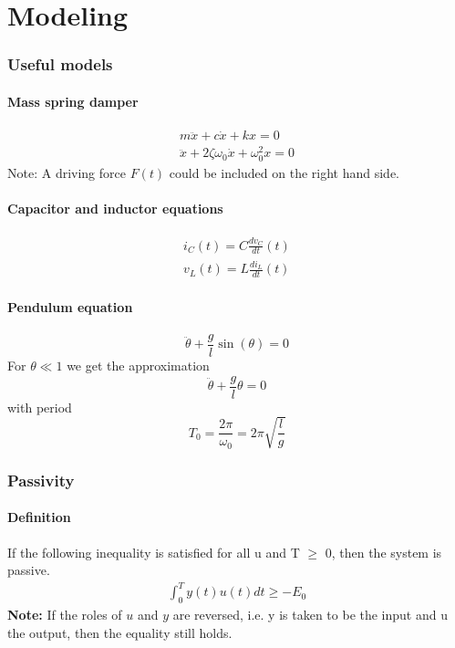 \part{Modeling}
\section{Useful models}
\subsection{Mass spring damper}
\begin{align}
    m\ddot{x} + c\dot{x} + kx = 0\\
    \ddot{x} + 2\zeta \omega_0 \dot{x} + \omega_0^2 x = 0
\end{align}
Note: A driving force $F(t)$ could be included on the right hand side.

\subsection{Capacitor and inductor equations}
\begin{align}
    i_C(t) = C\frac{dv_C}{dt}(t)\\
    v_L(t) = L\frac{di_L}{dt}(t)
\end{align}

\subsection{Pendulum equation}
\begin{equation}
    \ddot{\theta} + \frac{g}{l} \sin(\theta) = 0
\end{equation}
For $\theta \ll 1$ we get the approximation
\begin{equation}
    \ddot{\theta} + \frac{g}{l}\theta = 0
\end{equation}
with period
\begin{equation}
    T_0 = \frac{2\pi}{\omega_0} = 2\pi \sqrt{\frac{l}{g}}
\end{equation}

\newpage
\section{Passivity}
\subsection{Definition}
If the following inequality is satisfied for all u and T $\geq$ 0, then the system is passive.
\begin{align}
    \int_0^Ty(t)u(t)dt\geq -E_0
\end{align}
\textbf{Note:} If the roles of $u$ and $y$ are reversed, i.e. y is taken to be the input and u the output, then the equality still holds.

